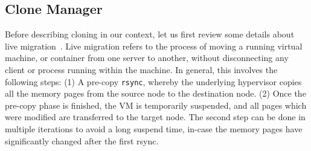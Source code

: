 \subsection{Clone Manager} 
\label{sec:CloneManager}



Before describing cloning in our context, let us first review some details about live migration~\cite{livemigration}. 
Live migration refers to the process of moving a running virtual machine, or container from one server to another, without disconnecting any client or process running within the machine. 
In general, this involves the following steps: 
(1) A pre-copy \texttt{rsync}, whereby the underlying hypervisor copies all the memory pages from the source node to the destination node. 
(2) Once the pre-copy phase is finished, the VM is temporarily suspended, and all pages which were modified are transferred to the target node. 
The second step can be done in multiple iterations to avoid a long suspend time, in-case the memory pages have significantly changed after the first rsync. 

